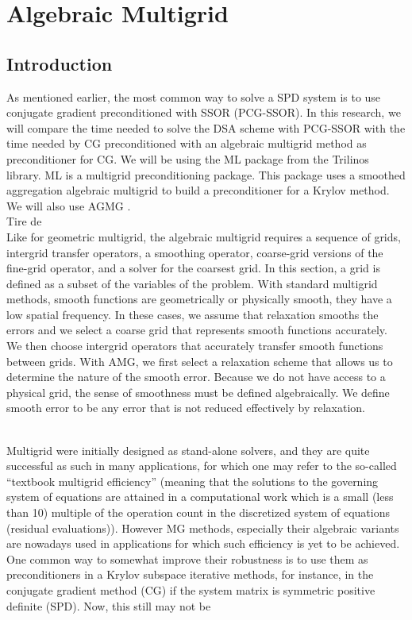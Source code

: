\section{Algebraic Multigrid}
\subsection{Introduction}
As mentioned earlier, the most common way to solve a SPD system is to use
conjugate gradient preconditioned with SSOR (PCG-SSOR). In this research, we
will compare the time needed to solve the DSA scheme with PCG-SSOR with the
time needed by CG preconditioned with an algebraic multigrid method as
preconditioner for CG. We will be using the ML package \cite{ml-guide} from
the Trilinos library. ML is a multigrid preconditioning package. This package
uses a smoothed aggregation algebraic multigrid to build a preconditioner for
a Krylov method. We will also use AGMG \cite{agmg_guide}.\\
 
Tire de \cite{amg}\\
Like for geometric multigrid, the algebraic multigrid requires a sequence of
grids, intergrid transfer operators, a smoothing operator, coarse-grid
versions of the fine-grid operator, and a solver for the coarsest grid. In
this section, a grid is defined as a subset of the variables of the problem.
With standard multigrid methods, smooth functions are geometrically or
physically smooth, they have a low spatial frequency. In these cases, we
assume that relaxation smooths the errors and we select a coarse grid that
represents smooth functions accurately. We then choose intergrid operators
that accurately transfer smooth functions between grids. With AMG, we first
select a relaxation scheme that allows us to determine the nature of the
smooth error. Because we do not have access to a physical grid, the sense of
smoothness must be defined algebraically. We define smooth error to be any
error that is not reduced effectively by relaxation.

\cite{k_cycle}\\
Multigrid were initially designed as stand-alone solvers, and they are quite
successful as such in many applications, for which one may refer to the
so-called ``textbook multigrid efficiency'' (meaning that the solutions to the
governing system of equations are attained in a computational work which is a
small (less than 10) multiple of the operation count in the discretized system
of equations (residual evaluations)). However MG methods, especially their
algebraic variants are nowadays used in applications for which such
efficiency is yet to be achieved. One common way to somewhat improve their
robustness is to use them as preconditioners in a Krylov subspace iterative
methods, for instance, in the conjugate gradient method (CG) if the system
matrix is symmetric positive definite (SPD). Now, this still may not be

